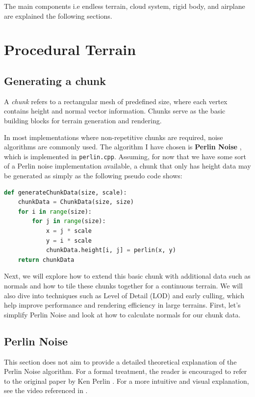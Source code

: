 The main components i.e endless terrain, cloud system, rigid body, and airplane are explained the following sections.

\section{Procedural Terrain}

\subsection{Generating a chunk}

\begin{definition}[Chunk]
A \textit{chunk} refers to a rectangular mesh of predefined size, where each vertex contains height and normal vector information. Chunks serve as the basic building blocks for terrain generation and rendering.
\end{definition}

In most implementations where non-repetitive chunks are required, noise algorithms are commonly used. The algorithm I have chosen is \textbf{Perlin Noise} \cite{perlin2002improving}, which is implemented in \texttt{perlin.cpp}. Assuming, for now that we have some sort of a Perlin noise implementation available, a chunk that only has height data may be generated as simply as the following pseudo code shows:

\begin{lstlisting}[language=Python]
def generateChunkData(size, scale):
	chunkData = ChunkData(size, size)
	for i in range(size):
		for j in range(size):
			x = j * scale
			y = i * scale
			chunkData.height[i, j] = perlin(x, y)
	return chunkData
\end{lstlisting}

Next, we will explore how to extend this basic chunk with additional data such as normals and how to tile these chunks together for a continuous terrain. We will also dive into techniques such as Level of Detail (LOD) and early culling, which help improve performance and rendering efficiency in large terrains. First, let’s simplify Perlin Noise and look at how to calculate normals for our chunk data.


\subsection{Perlin Noise}

This section does not aim to provide a detailed theoretical explanation of the Perlin Noise algorithm. For a formal treatment, the reader is encouraged to refer to the original paper by Ken Perlin \cite{perlin2002improving}. For a more intuitive and visual explanation, see the video referenced in \cite{perlin_video}. 

